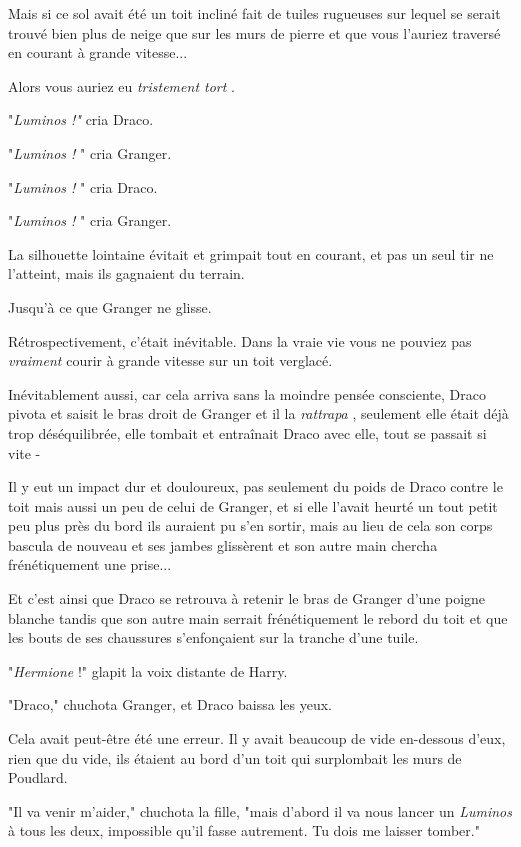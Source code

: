 Mais si ce sol avait été un toit incliné fait de tuiles rugueuses sur lequel se serait trouvé bien plus de neige que sur les murs de pierre et que vous l'auriez traversé en courant à grande vitesse...

Alors vous auriez eu \emph{tristement tort} .

"\emph{Luminos !" } cria Draco.

"\emph{Luminos !} " cria Granger.

"\emph{Luminos !} " cria Draco.

"\emph{Luminos !} " cria Granger.

La silhouette lointaine évitait et grimpait tout en courant, et pas un seul tir ne l'atteint, mais ils gagnaient du terrain.

Jusqu'à ce que Granger ne glisse.

Rétrospectivement, c'était inévitable. Dans la vraie vie vous ne pouviez pas \emph{vraiment}  courir à grande vitesse sur un toit verglacé.

Inévitablement aussi, car cela arriva sans la moindre pensée consciente, Draco pivota et saisit le bras droit de Granger et il la \emph{rattrapa} , seulement elle était déjà trop déséquilibrée, elle tombait et entraînait Draco avec elle, tout se passait si vite -

Il y eut un impact dur et douloureux, pas seulement du poids de Draco contre le toit mais aussi un peu de celui de Granger, et si elle l'avait heurté un tout petit peu plus près du bord ils auraient pu s'en sortir, mais au lieu de cela son corps bascula de nouveau et ses jambes glissèrent et son autre main chercha frénétiquement une prise...

Et c'est ainsi que Draco se retrouva à retenir le bras de Granger d'une poigne blanche tandis que son autre main serrait frénétiquement le rebord du toit et que les bouts de ses chaussures s'enfonçaient sur la tranche d'une tuile.

"\emph{Hermione}  !" glapit la voix distante de Harry.

"Draco," chuchota Granger, et Draco baissa les yeux.

Cela avait peut-être été une erreur. Il y avait beaucoup de vide en-dessous d'eux, rien que du vide, ils étaient au bord d'un toit qui surplombait les murs de Poudlard.

"Il va venir m'aider," chuchota la fille, "mais d'abord il va nous lancer un \emph{Luminos}  à tous les deux, impossible qu'il fasse autrement. Tu dois me laisser tomber."

